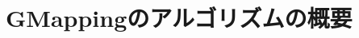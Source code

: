 \documentclass[{../../master}]{subfiles}
\begin{document}
\section{GMappingのアルゴリズムの概要}
\label{sec:gmapping_algorithm}
\end{document}

